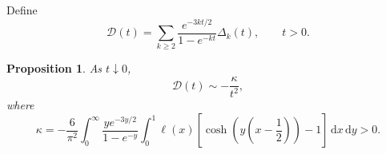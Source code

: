\documentclass[11pt]{amsart}
\numberwithin{equation}{section}
\newtheorem{proposition}[theorem]{Proposition}
\theoremstyle{definition}
\theoremstyle{remark}
\newcommand{\dd}{\,\mathrm d}
\begin{document}
Define
\begin{equation}\label{eq:mathcalD}
 \mathcal D(t)=\sum_{k\geq2}
 \frac{e^{-3kt/2}}{1-e^{-kt}}\Delta_k(t),
 \qquad t>0.
\end{equation}

\begin{proposition}\label{prop:D-scale}
As \(t\downarrow0\),
\begin{equation}\label{eq:D-scale}
 \mathcal D(t)\sim-\frac{\kappa}{t^2},
\end{equation}
where
\begin{equation}\label{eq:kappa}
 \kappa=-\frac6{\pi^2}\int_0^\infty
 \frac{y e^{-3y/2}}{1-e^{-y}}
 \int_0^1\ell(x)
 \left[\cosh\!\left(y\left(x-\frac12\right)\right)-1\right]
 \dd x\dd y>0.
\end{equation}
\end{proposition}
\end{document}

